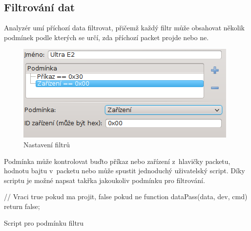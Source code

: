 \documentclass[12pt, a4paper, oneside]{article}
\begin{document}
\subsection{Filtrování dat}
Analyzér umí příchozí data filtrovat, přičemž každý filtr může obsahovat několik podmínek podle kterých se určí, zda příchozí packet projde nebo ne.
\begin{figure}[H]
\begin{center}
\includegraphics[scale=1]{img/filters.png}
\caption{Nastavení filtrů}
\end{center}
\end{figure}
Podmínka může kontrolovat buďto příkaz nebo zařízení z~hlavičky packetu, hodnotu bajtu v~packetu nebo může spustit jednoduchý uživatelský script. Díky scriptu je možné napsat takřka jakoukoliv podmínku pro filtrování.

\begin{listing}[H]
\begin{jscode}
// Vraci true pokud ma projit, false pokud ne
function dataPass(data, dev, cmd) {
    return false;
}
\end{jscode}
\caption{Script pro podmínku filtru}
\end{listing}

\end{document}

